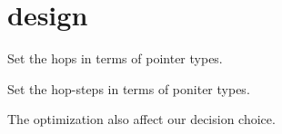 \section{design}

Set the hops in terms of pointer types.

Set the hop-steps in terms of poniter types.

The optimization also affect our decision choice.